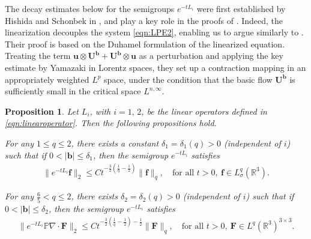 \documentclass[10pt]{amsart}
\theoremstyle{plain}
\newtheorem{proposition}[lemma]{Proposition}
\theoremstyle{definition}
\theoremstyle{remark}
\numberwithin{equation}{section}
\newcommand{\bb}{{\boldsymbol{b}}}
\newcommand{\bu}{{\boldsymbol{u}}}
\newcommand{\bU}{{\boldsymbol{U}}}
\newcommand{\Bf}{{\boldsymbol{f}}}
\newcommand{\BF}{{\boldsymbol{F}}}
\begin{document}
The decay estimates below for the semigroups $e^{-tL_i}$ were first established by Hishida and Schonbek in  \cite{HishidaSchonbek16}, and play a key role in the proofs of . Indeed, the linearization decouples the system \cref{eqn:LPE2}, enabling us to argue similarly to  \cite{HishidaSchonbek16}. 
Their proof is based on the Duhamel formulation of the linearized equation. Treating the term $\bu \otimes \bU^\bb + \bU^\bb \otimes \bu$ as a perturbation and applying the key estimate by Yamazaki \cite[Corollary 2.3(2)]{MR1777114} in Lorentz spaces, they set up a contraction mapping in an appropriately weighted $L^p$ space, under the condition that the basic flow $\bU^\bb$ is sufficiently small in the critical space $L^{n,\infty}$. 



\begin{proposition}\label{prop:decay} 
Let $L_i$, with $i =1,\,2$, be the linear operators defined in \cref{eqn:linearoperator}. Then the following propositions hold.
\begin{propenum}
\item \label{it:lmdecay1} For any $1 \le q \le 2$, there exists a constant $\delta_1=\delta_1(q)>0$ (independent of $i$) such that if $0<|\bb|\le \delta_1$, then the semigroup $e^{-tL_i}$ satisfies
\begin{align}\label{eqn:decay1}
\|e^{-tL_i} \Bf \|_2 \le Ct^{-\frac{3}{2}(\frac{1}{q}-\frac{1}{2})} \|\Bf\|_q,\quad \text{for all } t>0, \ \Bf \in  L^q_{\sigma}(\mathbb R^3). 
\end{align}

\item \label{it:lmdecay2}
For any $\frac{6}{5} < q \le 2$, there exists $\delta_2=\delta_2(q)>0$ (independent of $i$) such that if $0<|\bb|\le \delta_2$, then the semigroup $e^{-tL_i}$ satisfies
\begin{align}\label{eqn:decay2}
\|e^{-tL_i}\mathbb P \nabla\cdot \BF\|_2 
\le Ct^{ -\frac{3}{2}(\frac{1}{q}-\frac{1}{2}) -\frac{1}{2} } \| \BF \|_q,\quad \text{for all } t>0, \  \BF\in L^q(\mathbb R^3)^{3\times 3}. 
\end{align}
\end{propenum}
\end{proposition}
\end{document}
